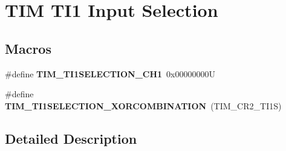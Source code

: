 \hypertarget{group___t_i_m___t_i1___selection}{}\section{T\+IM T\+I1 Input Selection}
\label{group___t_i_m___t_i1___selection}
\subsection*{Macros}
\begin{DoxyCompactItemize}
\item 
\mbox{\label{group___t_i_m___t_i1___selection_gace6563bccf7635461f660fbed6241488}} 
\#define {\bfseries T\+I\+M\+\_\+\+T\+I1\+S\+E\+L\+E\+C\+T\+I\+O\+N\+\_\+\+C\+H1}~0x00000000U
\item 
\mbox{\label{group___t_i_m___t_i1___selection_ga40dfcb0e3f2fdf0f45cbba227106310a}} 
\#define {\bfseries T\+I\+M\+\_\+\+T\+I1\+S\+E\+L\+E\+C\+T\+I\+O\+N\+\_\+\+X\+O\+R\+C\+O\+M\+B\+I\+N\+A\+T\+I\+ON}~(T\+I\+M\+\_\+\+C\+R2\+\_\+\+T\+I1S)
\end{DoxyCompactItemize}


\subsection{Detailed Description}
